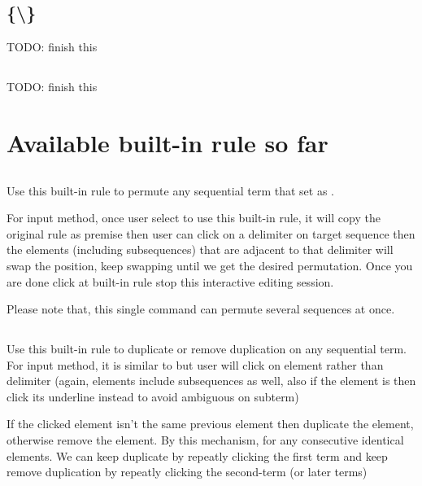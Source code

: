 \documentclass[master.tex]{subfiles}
\begin{document}
\subsection{\kRule {} \{\kInference \textbackslash \kCompound \} }
TODO: finish this

\subsection{\kTheorem {}}
TODO: finish this

\section{Available built-in rule so far}

\subsection{}
Use this built-in rule to permute any sequential term that set \kCommutative as \kTrue.

For input method, once user select to use this built-in rule, it will copy the original rule as premise then user can click on a delimiter on target sequence then the elements (including subsequences) that are adjacent to that delimiter will swap the position, keep swapping until we get the desired permutation. Once you are done click at built-in rule stop this interactive editing session.

Please note that, this single command can permute several sequences at once.

\subsection{}
Use this built-in rule to duplicate or remove duplication on any sequential term. For input method, it is similar to  but user will click on element rather than delimiter (again, elements include subsequences as well, also if the element is  then click its underline instead to avoid ambiguous on subterm)

If the clicked element isn't the same previous element then duplicate the element, otherwise remove the element. By this mechanism, for any consecutive identical elements. We can keep duplicate by repeatly clicking the first term and keep remove duplication by repeatly clicking the second-term (or later terms)
\end{document}
